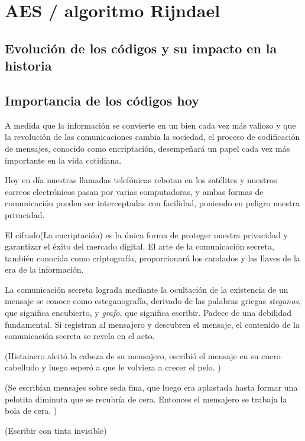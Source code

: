 \chapter{AES / algoritmo Rijndael}

	\section{Evolución de los códigos y su impacto en la historia}
	
	
	\section{Importancia de los códigos hoy}
	
	A medida que la información se convierte en un bien cada vez más valioso y que la revolución de las comunicaciones cambia la sociedad, el proceso de codificación de mensajes, conocido como encriptación, desempeñará un papel cada vez más importante en la vida cotidiana.
	
	Hoy en día nuestras llamadas telefónicas rebotan en los satélites y nuestros correos electrónicos pasan por varias computadoras, y ambas formas de comunicación pueden ser interceptadas con facilidad, poniendo en peligro nuestra privacidad.
	
	El cifrado(La encriptación) es la única forma de proteger nuestra privacidad y garantizar el éxito del mercado digital. El arte de la comunicación secreta, también conocida como criptografía, proporcionará los candados y las llaves de la era de la información.
	
	
	La comunicación secreta lograda mediante la ocultación de la existencia de un mensaje se conoce como esteganografía, derivado de las palabras griegas \textit{steganos}, que significa encubierto, y \textit{grafo}, que significa escribir.  Padece de una debilidad fundamental. Si registran al mensajero y descubren el mensaje, el contenido de la comunicación secreta se revela en el acto.
	
	
	(Histaiaero afeitó la cabeza de su mensajero, escribió el mensaje en su cuero cabelludo y luego esperó a que le volviera a crecer el pelo. )
	
	 (Se escribían mensajes sobre seda fina, que luego era aplastada hasta formar una pelotita diminuta que se recubría de cera. Entonces el mensajero se trabaja la bola de cera. ) 
	 
	 (Escribir con tinta invisible)
	 
